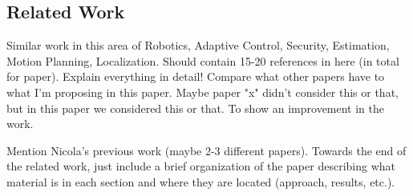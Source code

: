 

\subsection{Related Work}
\label{sec:Related Work}

Similar work in this area of Robotics, Adaptive Control, Security, Estimation, Motion Planning, Localization. Should contain 15-20 references in here (in total for paper). Explain everything in detail! Compare what other papers have to what I'm proposing in this paper. Maybe paper "x" didn't consider this or that, but in this paper we considered this or that. To show an improvement in the work. 

Mention Nicola's previous work (maybe 2-3 different papers). Towards the end of the related work, just include a brief organization of the paper describing what material is in each section and where they are located (approach, results, etc.).

